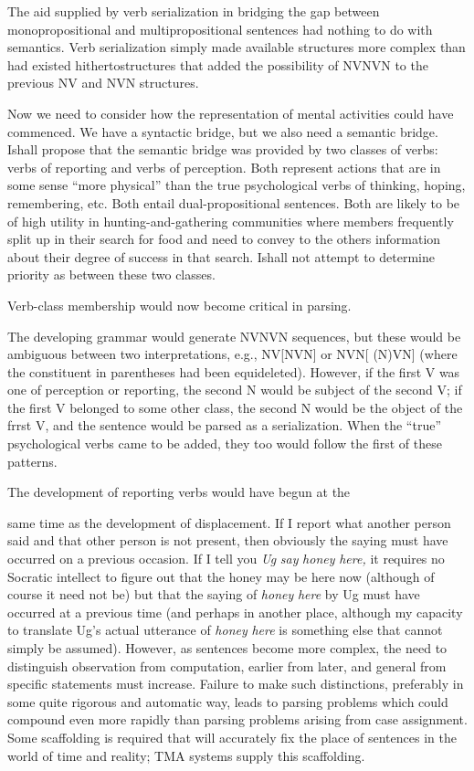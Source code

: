 The aid supplied by verb serialization in bridging the gap between monopropositional and multipropositional sentences had nothing to do with semantics. Verb serialization simply made available structures more complex than had existed hithertostructures that added the possibility of NVNVN to the previous NV and NVN structures.

Now we need to consider how the representation of mental activities could have commenced. We have a syntactic bridge, but we also need a semantic bridge. Ishall propose that the semantic bridge was provided by two classes of verbs: verbs of reporting and verbs of perception. Both represent actions that are in some sense ``more phy\-sical'' than the true psychological verbs of thinking, hoping, remem\-bering, etc. Both entail dual-propositional sentences. Both are likely to be of high utility in hunting-and-gathering communities where members frequently split up in their search for food and need to con\-vey to the others information about their degree of success in that search. Ishall not attempt to determine priority as between these two classes.

Verb-class membership would now become critical in parsing.


The developing grammar would generate NVNVN sequences, but these would be ambiguous between two interpretations, e.g., NV[NVN] or NVN[ (N)VN] (where the constituent in parentheses had been equi\-deleted). However, if the first V was one of perception or reporting, the second N would be subject of the second V; if the first V belonged to some other class, the second N would be the object of the frrst V, and the sentence would be parsed as a serialization. When the ``true'' psychological verbs came to be added, they too would follow the first of these patterns.

The development of reporting verbs would have begun at the

same time as the development of displacement. If I report what another person said and that other person is not present, then obviously the saying must have occurred on a previous occasion. If I tell you \textit{U}\textit{g} \textit{say} \textit{honey} \textit{here,} it requires no Socratic intellect to figure out that the honey may be here now (although of course it need not be) but that the saying of \textit{honey} \textit{here} by Ug must have occurred at a previous time (and perhaps in another place, although my capacity to translate Ug's actual utterance of \textit{honey} \textit{here} is something else that cannot simply be assumed). However, as sentences become more complex, the need to distinguish observation from computation, earlier from later, and general from specific statements must increase. Failure to make such distinctions, preferably in some quite rigorous and automatic way, leads to parsing problems which could compound even more rapidly than parsing problems arising from case assignment. Some scaffolding is required that will accurately fix the place of sentences in the world of time and reality; TMA systems supply this scaffolding.

